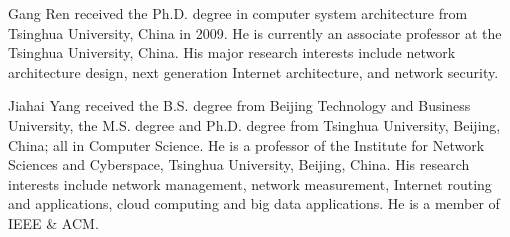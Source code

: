\documentclass[journal]{IEEEtran}
\begin{document}
\begin{IEEEbiographynophoto}{Gang Ren}
received the Ph.D. degree in computer system architecture from Tsinghua University, China in 2009. He is currently an associate professor at the Tsinghua University, China. His major research interests include network architecture design, next generation Internet architecture, and network security.
\vspace{-1.1 cm}
\end{IEEEbiographynophoto}

\begin{IEEEbiographynophoto}{Jiahai Yang}
received the B.S. degree from Beijing Technology and Business University, the M.S. degree and Ph.D. degree from Tsinghua University, Beijing, China; all in Computer Science. He is a professor of the Institute for Network Sciences and Cyberspace, Tsinghua University, Beijing, China. His research interests include network management, network measurement, Internet routing and applications, cloud computing and big data applications. He is a member of IEEE \& ACM.
\end{IEEEbiographynophoto}
\end{document}
